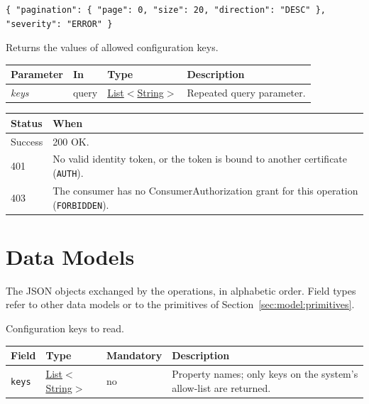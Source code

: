 \documentclass[a4paper]{arrowhead}
\newcommand{\fparam}[1]{\textit{\textcolor{ArrowheadBlue}{#1}}}
\newcommand{\pref}[1]{{\textcolor{ArrowheadGrey}{\hyperref[sec:model:primitives:#1]{#1}}}}
\begin{document}
\begin{lstlisting}[caption={Example request body}]
{ "pagination": { "page": 0, "size": 20, "direction": "DESC" }, "severity": "ERROR" }
\end{lstlisting}

Returns the values of allowed configuration keys.

{\small
\begin{longtable}{|p{3.0cm}|p{1.4cm}|p{3.2cm}|p{8.2cm}|}

\hline
\rowcolor{gray!33} Parameter & In & Type & Description \\ \hline
\endhead
\fparam{keys} & query & \pref{List}$<$\pref{String}$>$ & Repeated query parameter. \\ \hline
\end{longtable}
}


{\small
\begin{longtable}{|p{2.0cm}|p{13.8cm}|}

\hline
\rowcolor{gray!33} Status & When \\ \hline
\endhead
Success & 200 OK. \\ \hline
401 & No valid identity token, or the token is bound to another certificate (\texttt{AUTH}). \\ \hline
403 & The consumer has no ConsumerAuthorization grant for this operation (\texttt{FORBIDDEN}). \\ \hline
\end{longtable}
}


\newpage
\section{Data Models}
\label{sec:model}
The JSON objects exchanged by the operations, in alphabetic order. Field types refer to other data models or to the
primitives of Section~\ref{sec:model:primitives}.

Configuration keys to read.

{\small
\begin{longtable}{|p{3.7cm}|p{4.2cm}|p{1.6cm}|p{6.3cm}|}

\hline
\rowcolor{gray!33} Field & Type & Mandatory & Description \\ \hline
\endhead
\texttt{keys} & \pref{List}$<$\pref{String}$>$ & no & Property names; only keys on the system's allow-list are returned. \\ \hline
\end{longtable}
}
\end{document}
